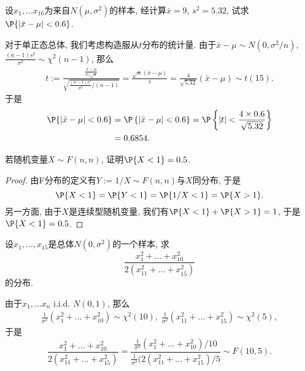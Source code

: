 \documentclass[11pt]{ctexart}
\begin{document}
\begin{example}
	设$x_1, \dots x_{16}$为来自$N(\mu, \sigma^2)$的样本, 经计算$\bar x = 9$, $s^2 = 5.32$, 试求$\P\{|\bar x - \mu| < 0.6\}$. 
\end{example}
\begin{solution}
	对于单正态总体, 我们考虑构造服从$t$分布的统计量. 
	由于$\bar x - \mu \sim N(0, \sigma^2 / n)$, $\frac{(n-1) s^2}{\sigma^2} \sim \chi^2(n-1)$, 那么
	\begin{align*}
		t 
		:= \frac{\frac{\bar x - \mu}{\sigma / \sqrt{n}}}{\sqrt{\frac{(n-1) s^2}{\sigma^2} / (n-1)}}
		= \frac{\sqrt{n}(\bar x - \mu)}{s} 
		= \frac{4}{\sqrt{5.32}} (\bar x - \mu)
		\sim t(15). 
	\end{align*}
	于是
	\begin{align*}
		\P\{|\bar x - \mu| < 0.6\}
		&= \P\left\{|\bar x - \mu| < 0.6\right\}
		= \P\left\{|t| < \frac{4 \times 0.6}{\sqrt{5.32}} \right\} \\
		&
		= 0.6854. 
	\end{align*}
\end{solution}

\begin{example}
	若随机变量$X \sim F(n,n)$, 证明$\P\{X<1\} = 0.5$. 
\end{example}
\begin{proof}
	由F分布的定义有$Y := 1/X \sim F(n,n)$与$X$同分布, 于是
	\begin{equation*}
		\P\{X < 1\}
		= \P\{Y < 1\}
		= \P\{1/X < 1\}
		= \P\{X > 1\}. 
	\end{equation*}
	另一方面, 由于$X$是连续型随机变量, 我们有$\P\{X < 1\} + \P\{X > 1\} = 1$, 于是$\P\{X < 1\} = 0.5$. 
\end{proof}

\begin{example}
	设$x_1, \dots, x_{15}$是总体$N(0, \sigma^2)$的一个样本, 求
	\begin{equation*}
		\frac{x_1^2 + \dots + x_{10}^2}{2(x_{11}^2 + \dots + x_{15}^2)}
	\end{equation*}
	的分布. 
\end{example}
\begin{solution}
	由于$x_1, \dots x_n$ i.i.d. $N(0,1)$, 那么
	\begin{align*}
		\frac{1}{\sigma^2}(x_1^2 + \dots + x_{10}^2) \sim \chi^2(10), \; 
		\frac{1}{\sigma^2}(x_{11}^2 + \dots + x_{15}^2) \sim \chi^2(5), 
	\end{align*}
	于是
	\begin{equation*}
		\frac{x_1^2 + \dots + x_{10}^2}{2(x_{11}^2 + \dots + x_{15}^2)}
		= \frac{\frac{1}{\sigma^2}(x_1^2 + \dots + x_{10}^2) / 10}{\frac{1}{\sigma^2}(2(x_{11}^2 + \dots + x_{15}^2) / 5}
		\sim F(10, 5). 
	\end{equation*}
\end{solution}
\end{document}
